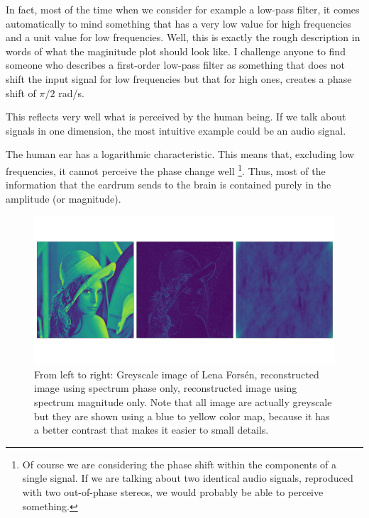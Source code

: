 In fact, most of the time when we consider for example a low-pass filter, it
comes automatically to mind something that has a very low value for high
frequencies and a unit value for low frequencies. Well, this is exactly the
rough description in words of what the maginitude plot should look like. I
challenge anyone to find someone who describes a first-order low-pass filter
as something that does not shift the input signal for low frequencies but that
for high ones, creates a phase shift of $\pi/2$ rad/s.

This reflects very well what is perceived by the human being. If we talk about
signals in one dimension, the most intuitive example could be an audio signal. 

The human ear has a logarithmic characteristic. This means that, excluding low frequencies,
it cannot perceive the phase change well \footnote{Of course we are
considering the phase shift within the components of a single signal. If we
are talking about two identical audio signals, reproduced with two
out-of-phase stereos, we would probably be able to perceive something.}. Thus,
most of the information that the eardrum sends to the brain is contained
purely in the amplitude (or magnitude).

\begin{figure}
  \centering
  \includegraphics[width=.95\textwidth, trim=0 100 0 100, clip]{papers/kugel/figures/python/phase_vs_abs.pdf}
  \caption {
    From left to right: Greyscale image of Lena Forsén, reconstructed image
    using spectrum phase only, reconstructed image using spectrum magnitude
    only. Note that all image are actually greyscale but they are shown using
    a blue to yellow color map, because it has a better contrast that makes it
    easier to small details.
    \label{kugel:fig:2d-fourier-phasevsmagn}
  }
\end{figure}

